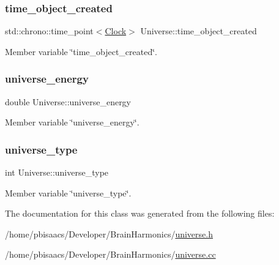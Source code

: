 \mbox{\label{classUniverse_a49ef0c3c2bd9ec438f5d9703c6aaa402}} 
\subsubsection{\texorpdfstring{time\+\_\+object\+\_\+created}{time\_object\_created}}
{\footnotesize\ttfamily std\+::chrono\+::time\+\_\+point$<$\mbox{\hyperlink{universe_8h_a0ef8d951d1ca5ab3cfaf7ab4c7a6fd80}{Clock}}$>$ Universe\+::time\+\_\+object\+\_\+created\hspace{0.3cm}{\ttfamily [private]}}



Member variable \char`\"{}time\+\_\+object\+\_\+created\char`\"{}. 

\mbox{\label{classUniverse_a86742eff738f3d7812da8581a59f0812}} 
\subsubsection{\texorpdfstring{universe\+\_\+energy}{universe\_energy}}
{\footnotesize\ttfamily double Universe\+::universe\+\_\+energy\hspace{0.3cm}{\ttfamily [private]}}



Member variable \char`\"{}universe\+\_\+energy\char`\"{}. 

\mbox{\label{classUniverse_a4332e3210a61dcfcb26e16b9f604d489}} 
\subsubsection{\texorpdfstring{universe\+\_\+type}{universe\_type}}
{\footnotesize\ttfamily int Universe\+::universe\+\_\+type\hspace{0.3cm}{\ttfamily [private]}}



Member variable \char`\"{}universe\+\_\+type\char`\"{}. 



The documentation for this class was generated from the following files\+:\begin{DoxyCompactItemize}
\item 
/home/pbisaacs/\+Developer/\+Brain\+Harmonics/\mbox{\hyperlink{universe_8h}{universe.\+h}}\item 
/home/pbisaacs/\+Developer/\+Brain\+Harmonics/\mbox{\hyperlink{universe_8cc}{universe.\+cc}}\end{DoxyCompactItemize}
